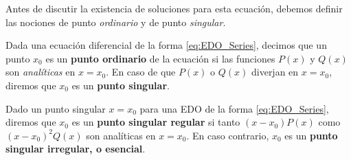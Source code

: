 Antes de discutir la existencia de soluciones para esta ecuación, debemos definir las nociones de punto \emph{ordinario} y de punto \emph{singular}.

\begin{defi} 
    Dada una ecuación diferencial de la forma \eqref{eq:EDO_Series}, decimos que un punto $x_0$ es un \textbf{punto ordinario} de la ecuación si las funciones $P(x)$ y $Q(x)$ son \emph{analíticas} en $x=x_0$. En caso de que $P(x)$ o $Q(x)$ diverjan en $x = x_0$, diremos que $x_0$ es un \textbf{punto singular}. 
\end{defi}

\begin{defi} 
    Dado un punto singular $x=x_0$ para una EDO de la forma \eqref{eq:EDO_Series}, diremos que $x_0$ es un \textbf{punto singular regular} si tanto $(x-x_0)P(x)$ como $(x-x_0)^2Q(x)$ son analíticas en $x=x_0$. En caso contrario, $x_0$ es un \textbf{punto singular irregular, o esencial}.
\end{defi}

